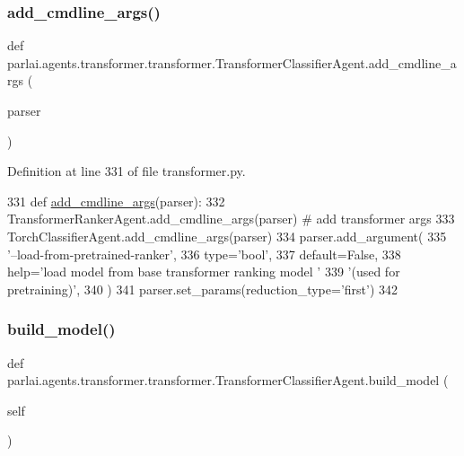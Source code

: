 \subsubsection{\texorpdfstring{add\+\_\+cmdline\+\_\+args()}{add\_cmdline\_args()}}
{\footnotesize\ttfamily def parlai.\+agents.\+transformer.\+transformer.\+Transformer\+Classifier\+Agent.\+add\+\_\+cmdline\+\_\+args (\begin{DoxyParamCaption}\item[{}]{parser }\end{DoxyParamCaption})\hspace{0.3cm}{\ttfamily [static]}}



Definition at line 331 of file transformer.\+py.


\begin{DoxyCode}
331     \textcolor{keyword}{def }\hyperlink{namespaceparlai_1_1agents_1_1drqa_1_1config_a62fdd5554f1da6be0cba185271058320}{add\_cmdline\_args}(parser):
332         TransformerRankerAgent.add\_cmdline\_args(parser)  \textcolor{comment}{# add transformer args}
333         TorchClassifierAgent.add\_cmdline\_args(parser)
334         parser.add\_argument(
335             \textcolor{stringliteral}{'--load-from-pretrained-ranker'},
336             type=\textcolor{stringliteral}{'bool'},
337             default=\textcolor{keyword}{False},
338             help=\textcolor{stringliteral}{'load model from base transformer ranking model '}
339             \textcolor{stringliteral}{'(used for pretraining)'},
340         )
341         parser.set\_params(reduction\_type=\textcolor{stringliteral}{'first'})
342 
\end{DoxyCode}
\mbox{\label{classparlai_1_1agents_1_1transformer_1_1transformer_1_1TransformerClassifierAgent_a0f9c5184483a7bc0d0162ecc2cdeab5b}} 
\subsubsection{\texorpdfstring{build\+\_\+model()}{build\_model()}}
{\footnotesize\ttfamily def parlai.\+agents.\+transformer.\+transformer.\+Transformer\+Classifier\+Agent.\+build\+\_\+model (\begin{DoxyParamCaption}\item[{}]{self }\end{DoxyParamCaption})}



